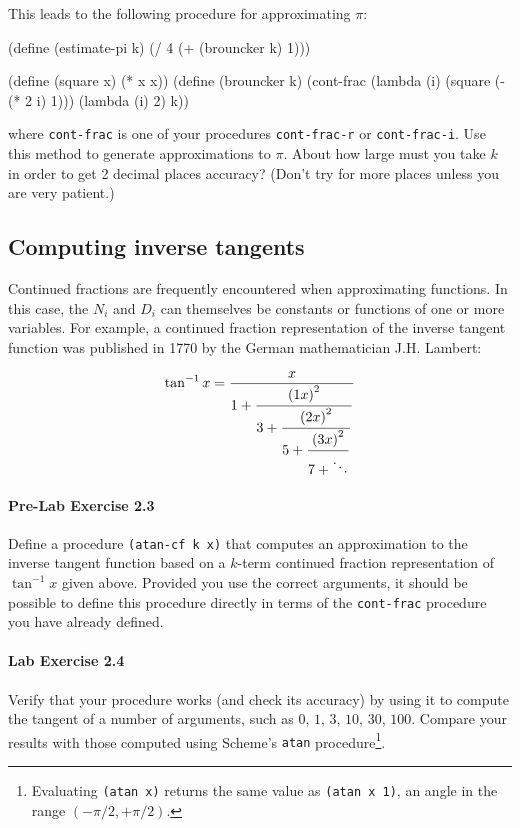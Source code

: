 This leads to the following procedure for approximating $\pi$:

\beginlisp
(define (estimate-pi k)
  (/ 4 (+ (brouncker k) 1)))
\endlisp

\beginlisp
(define (square x) (* x x))
\null
(define (brouncker k)
  (cont-frac (lambda (i) (square (- (* 2 i) 1)))
             (lambda (i) 2)
             k))
\endlisp

where {\tt cont-frac} is one of your procedures {\tt cont-frac-r} or
{\tt cont-frac-i}.  Use this method to generate approximations to $\pi$.
About how large must you take $k$ in order to get 2 decimal places
accuracy?  (Don't try for more places unless you are very patient.)

\subsection{Computing inverse tangents}

Continued fractions are frequently encountered when approximating
functions.  In this case, the $N_i$ and $D_i$ can themselves be
constants or functions of one or more variables.  For example, a
continued fraction representation of the inverse tangent function 
was published in 1770 by the German mathematician J.H. Lambert:

\begin{displaymath}
{\tan^{-1}x} ={x \over 
{\displaystyle 1+{\strut {\left( {1x} \right)^2} \over 
{\displaystyle 3+{\strut {\left( {2x} \right)^2} \over 
{\displaystyle 5+{\strut {\left( {3x} \right)^2} \over {7+\ddots }}}}}}}}
\end{displaymath}

\paragraph{Pre-Lab Exercise 2.3}
Define a procedure {\tt (atan-cf k x)} that computes an approximation
to the inverse tangent function based on a $k$-term continued fraction
representation of $\tan^{-1} x$ given above. Provided you use the
correct arguments, it should be possible to
define this procedure directly in terms of the {\tt cont-frac}
procedure you have already defined. 

\paragraph{Lab Exercise 2.4}
Verify that your
procedure works (and check its accuracy) by using it to compute the
tangent of a number of arguments, such as $0$, 
$1$, $3$, $10$, $30$, $100$.
Compare your results with those computed using
Scheme's {\tt atan} procedure\footnote{Evaluating {\tt (atan x)}
returns the same value as {\tt (atan x 1)}, an angle in the range
$(-\pi/2, +\pi/2)$.}. 


